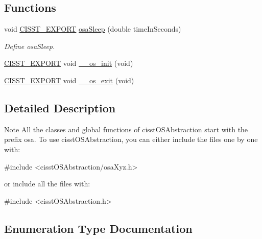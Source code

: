 \subsection*{Functions}
\begin{DoxyCompactItemize}
\item 
void \hyperlink{cmn_export_macros_8h_a99393e0c3ac434b2605235bbe20684f8}{C\+I\+S\+S\+T\+\_\+\+E\+X\+P\+O\+R\+T} \hyperlink{group__cisst_o_s_abstraction_ga54ab2658f0c75b6004c12c11d96f2e00}{osa\+Sleep} (double time\+In\+Seconds)
\begin{DoxyCompactList}\small\item\em Define osa\+Sleep. \end{DoxyCompactList}\item 
\hyperlink{cmn_export_macros_8h_a99393e0c3ac434b2605235bbe20684f8}{C\+I\+S\+S\+T\+\_\+\+E\+X\+P\+O\+R\+T} void \hyperlink{group__cisst_o_s_abstraction_gae5841775264a0bce1dc3e04ed9049f62}{\+\_\+\+\_\+os\+\_\+init} (void)
\item 
\hyperlink{cmn_export_macros_8h_a99393e0c3ac434b2605235bbe20684f8}{C\+I\+S\+S\+T\+\_\+\+E\+X\+P\+O\+R\+T} void \hyperlink{group__cisst_o_s_abstraction_gacc130f6821ff63dd4281f663837649e9}{\+\_\+\+\_\+os\+\_\+exit} (void)
\end{DoxyCompactItemize}


\subsection{Detailed Description}
\begin{DoxyNote}{Note}
All the classes and global functions of cisst\+O\+S\+Abstraction start with the prefix osa. To use cisst\+O\+S\+Abstraction, you can either include the files one by one with\+: 
\begin{DoxyCode}
\textcolor{preprocessor}{#include <cisstOSAbstraction/osaXyz.h>}
\end{DoxyCode}
 or include all the files with\+: 
\begin{DoxyCode}
\textcolor{preprocessor}{#include <cisstOSAbstraction.h>}
\end{DoxyCode}
 
\end{DoxyNote}


\subsection{Enumeration Type Documentation}
\hypertarget{group__cisst_o_s_abstraction_ga3fd8e997892088f924754f9cc11c78a4}{}
